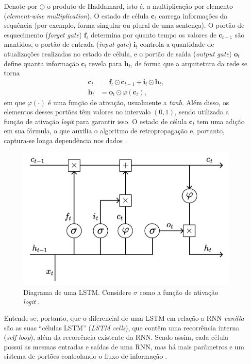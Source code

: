 \documentclass{automatextcc}
\newcommand{\bs}[1]{\boldsymbol{#1}}
\begin{document}
Denote por $\odot$ o produto de Haddamard, isto é, a multiplicação por elemento (\textit{element-wise multiplication}). O estado de célula $\bs{c}_t$ carrega informações da sequência (por exemplo, forma singular ou plural de uma sentença). O portão de esquecimento (\textit{forget gate}) $\bs{f}_t$ determina por quanto tempo os valores de $\bs{c}_{t-1}$ são mantidos, o portão de entrada (\textit{input gate}) $\bs{i}_t$ controla a quantidade de atualizações realizadas no estado de célula, e o portão de saída (\textit{output gate}) $\bs{o}_t$ define quanta informação $\bs{c}_t$ revela para $\bs{h}_t$, de forma que a arquitetura da rede se torna 
\begin{align*}
    \bs{c}_{t} & = \bs{f}_{t} \odot \bs{c}_{t-1} + \bs{i}_{t} \odot \bs{h}_{t}, \\
    \bs{h}_{t} & = \bs{o}_{t} \odot \varphi(\bs{c}_{t}),
\end{align*}
em que $\varphi(\cdot)$ é uma função de ativação, usualmente a \textit{tanh}. Além disso, os elementos desses portões têm valores no intervalo $(0,1)$, sendo utilizada a função de ativação \textit{logit} para garantir isso. O estado de célula $\bs{c}_t$ tem uma adição em sua fórmula, o que auxilia o algoritmo de retropropagação e, portanto, captura-se longa dependência nos dados \citep{goodfellow2016, fan2021}.

\begin{figure}[H]
    \centering
    \includegraphics[width=\textwidth]{figuras/lstm_cell.pdf}
	\caption{Diagrama de uma LSTM. Considere $\sigma$ como a função de ativação \textit{logit} \citep[adaptado de][]{goodfellow2016, kamath2019}.}
\end{figure}

Entende-se, portanto, que o diferencial de uma LSTM em relação a RNN \textit{vanilla} são as suas ``células LSTM'' (\textit{LSTM cells}), que contêm uma recorrência interna (\textit{self-loop}), além da recorrência existente da RNN. Sendo assim, cada célula possui as mesmas entradas e saídas de uma RNN, mas há mais parâmetros e um sistema de portões controlando o fluxo de informação \citep{goodfellow2016}.
\end{document}
